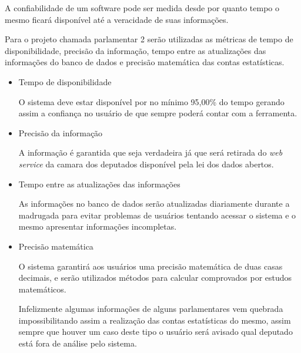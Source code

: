 A confiabilidade de um software pode ser medida desde por quanto tempo o mesmo ficará disponível até a veracidade de suas informações.

Para o projeto chamada parlamentar 2 serão utilizadas as métricas de tempo de disponibilidade, precisão da informação, tempo entre as atualizações das informações do banco de dados e precisão matemática das contas estatísticas.

\begin{itemize} 

	\item{Tempo de disponibilidade}

		O sistema deve estar disponível por no mínimo 95,00\% do tempo gerando assim a confiança no usuário de que sempre poderá contar com a ferramenta.

	\item{Precisão da informação}

		A informação é garantida que seja verdadeira já que será retirada do \textit{web service} da camara dos deputados disponível pela lei dos dados abertos.

	\item{Tempo entre as atualizações das informações}

		As informações no banco de dados serão atualizadas diariamente durante a madrugada para evitar problemas de usuários tentando acessar o sistema e o mesmo apresentar informações incompletas.

	\item{Precisão matemática}

		O sistema garantirá aos usuários uma precisão matemática de duas casas decimais, e serão utilizados métodos para calcular comprovados por estudos matemáticos.

		Infelizmente algumas informações de alguns parlamentares vem quebrada impossibilitando assim a realização das contas estatísticas do mesmo, assim sempre que houver um caso deste tipo o usuário será avisado qual deputado está fora de análise pelo sistema.

\end{itemize}